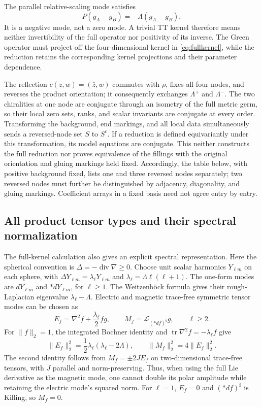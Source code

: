 \documentclass[a4paper,11pt]{article}
\numberwithin{equation}{section}
\theoremstyle{definition}
\newcommand{\tr}{\operatorname{tr}}
\begin{document}
The parallel relative-scaling mode satisfies
\[
P(g_A-g_B)=-\Lambda(g_A-g_B),
\]
It is a negative mode, not a zero mode. A trivial TT kernel therefore means neither invertibility of the full operator nor positivity of its inverse. The Green operator must project off the four-dimensional kernel in \eqref{eq:fullkernel}, while the reduction retains the corresponding kernel projections and their parameter dependence.

The reflection $c(z,w)=(\bar z,w)$ commutes with $\rho$, fixes all four nodes, and reverses the product orientation; it consequently exchanges $\Lambda^+$ and $\Lambda^-$.
The two chiralities at one node are conjugate through an isometry of the full metric germ, so their local zero sets, ranks, and scalar invariants are conjugate at every order.
Transforming the background, end markings, and all local data simultaneously sends a reversed-node set $S$ to $S^c$.
If a reduction is defined equivariantly under this transformation, its model equations are conjugate. This neither constructs the full reduction
nor proves equivalence of the fillings with the original orientation and gluing markings held fixed. Accordingly, the table below, with positive background fixed,
lists one and three reversed nodes separately; two reversed nodes must further be distinguished by adjacency, diagonality, and gluing markings.
Coefficient arrays in a fixed basis need not agree entry by entry.

\subsection{All product tensor types and their spectral normalization}\label{sec:productspectrum}
The full-kernel calculation also gives an explicit spectral representation. Here the spherical convention is
$\Delta=-\operatorname{div}\nabla\ge0$. Choose unit scalar harmonics
$Y_{\ell m}$ on each sphere, with $\Delta Y_{\ell m}=\lambda_\ell Y_{\ell m}$ and
$\lambda_\ell=\Lambda\ell(\ell+1)$. The one-form modes are
$dY_{\ell m}$ and $*dY_{\ell m}$, for $\ell\ge1$.
The Weitzenb\"ock formula gives their rough-Laplacian eigenvalue $\lambda_\ell-\Lambda$.
Electric and magnetic trace-free symmetric tensor modes can be chosen as
\[
E_f=\nabla^2f+\frac{\lambda_\ell}{2}fg,
\qquad M_f=\mathcal L_{(*df)^\sharp}g,\qquad \ell\ge2.
\]
For $\|f\|_2=1$, the integrated Bochner identity and $\tr\nabla^2f=-\lambda_\ell f$ give
\begin{equation}\label{eq:spherical-tensor-norms}
\|E_f\|_2^2=\frac12\lambda_\ell(\lambda_\ell-2\Lambda),
\qquad \|M_f\|_2^2=4\|E_f\|_2^2.
\end{equation}
The second identity follows from $M_f=\pm2JE_f$ on two-dimensional trace-free tensors, with $J$ parallel and norm-preserving.
Thus, when using the full Lie derivative as the magnetic mode, one cannot double its polar amplitude while retaining the electric mode's squared norm.
For $\ell=1$, $E_f=0$ and $(*df)^\sharp$ is Killing, so $M_f=0$.
\end{document}

